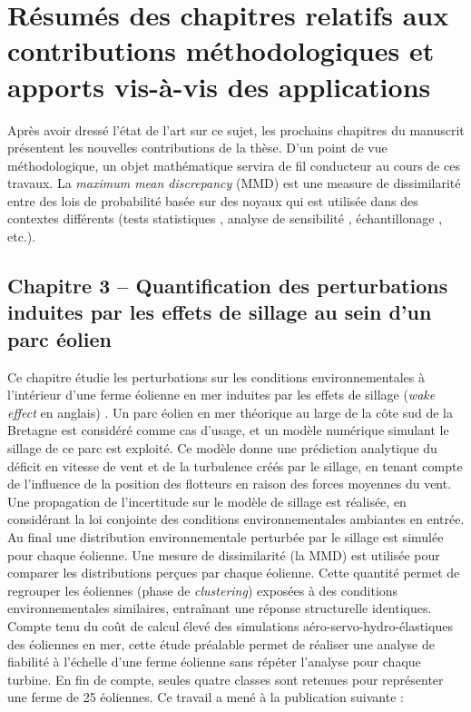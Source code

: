 \section{Résumés des chapitres relatifs aux contributions méthodologiques et apports vis-à-vis des applications}

Après avoir dressé l'état de l'art sur ce sujet, les prochains chapitres du manuscrit présentent les nouvelles contributions de la thèse. 
D'un point de vue méthodologique, un objet mathématique servira de fil conducteur au cours de ces travaux. 
La \textit{maximum mean discrepancy} (MMD) \cite{oates_21} est une measure de dissimilarité entre des lois de probabilité basée sur des noyaux qui est utilisée dans des contextes différents (tests statistiques \cite{gretton_2006}, analyse de sensibilité \cite{daveiga_2015}, échantillonage \cite{pronzato_zhigljavsky_2020}, etc.).

\subsection*{Chapitre 3 -- Quantification des perturbations induites par les effets de sillage au sein d'un parc éolien}

Ce chapitre étudie les perturbations sur les conditions environnementales à l'intérieur d'une ferme éolienne en mer induites par les effets de sillage (\textit{wake effect} en anglais) \cite{larsen_2008_wake}. 
Un parc éolien en mer théorique au large de la côte sud de la Bretagne est considéré comme cas d'usage, et un modèle numérique simulant le sillage de ce parc est exploité. 
Ce modèle donne une prédiction analytique du déficit en vitesse de vent et de la turbulence créés par le sillage, en tenant compte de l'influence de la position des flotteurs en raison des forces moyennes du vent. 
Une propagation de l'incertitude sur le modèle de sillage est réalisée, en considérant la loi conjointe des conditions environnementales ambiantes en entrée. 
Au final une distribution environnementale perturbée par le sillage est simulée pour chaque éolienne. 
Une mesure de dissimilarité (la MMD) est utilisée pour comparer les distributions perçues par chaque éolienne. 
Cette quantité permet de regrouper les éoliennes (phase de \textit{clustering}) exposées à des conditions environnementales similaires, entraînant une réponse structurelle identiques. 
Compte tenu du coût de calcul élevé des simulations aéro-servo-hydro-élastiques des éoliennes en mer, cette étude préalable permet de réaliser une analyse de fiabilité à l'échelle d'une ferme éolienne sans répéter l'analyse pour chaque turbine. 
En fin de compte, seules quatre classes sont retenues pour représenter une ferme de 25 éoliennes. 
Ce travail a mené à la publication suivante : \\

